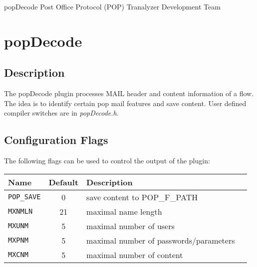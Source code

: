 \documentclass[documentation]{subfiles}
\begin{document}
\trantitle
    {popDecode}
    {Post Office Protocol (POP)}
    {Tranalyzer Development Team} %

\section{popDecode}\label{s:popDecode}

\subsection{Description}
The popDecode plugin processes MAIL header and content information of a flow. The idea is to identify
certain pop mail features and save content. User defined compiler switches are in {\em popDecode.h}.

\subsection{Configuration Flags}
The following flags can be used to control the output of the plugin:
\begin{longtable}{lcll}
    \toprule
    {\bf Name} & {\bf Default} & {\bf Description} \\
    \midrule\endhead%
    {\tt POP\_SAVE} &  0 & save content to POP\_F\_PATH\\
    {\tt MXNMLN}    & 21 & maximal name length  \\
    {\tt MXUNM}     &  5 & maximal number of users \\
    {\tt MXPNM}     &  5 & maximal number of passwords/parameters \\
    {\tt MXCNM}     &  5 & maximal number of content \\
    \bottomrule
\end{longtable}
\end{document}
